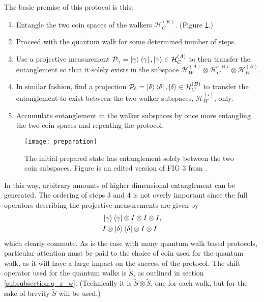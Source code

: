 The basic premise of this protocol is this:
\begin{enumerate}
    \item Entangle the two coin spaces of the walkers $\mathcal{H}^{(K)}_C$. (Figure \ref{fig:preparation}.)
    \item Proceed with the quantum walk for some determined number of steps.
    \item Use a projective measurement $\mathcal{P}_\gamma = \ket{\gamma}\bra{\gamma}, \ket{\gamma}\in\mathcal{H}^{(A)}_C$ to then transfer the entanglement so that it solely exists in the subspace $\mathcal{H}^{(A)}_W \otimes \mathcal{H}^{(B)}_C \otimes \mathcal{H}^{(B)}_W$.
    \item In similar fashion, find a projection $\mathcal{P}_\delta = \ket{\delta}\bra{\delta}, \ket{\delta}\in\mathcal{H}^{(B)}_C$ to transfer the entanglement to exist between the two walker subspaces, $\mathcal{H}^{(i)}_W$, only.
    \item Accumulate entanglement in the walker subspaces by once more entangling the two coin spaces and repeating the protocol.
\end{enumerate}

\begin{figure}
    \centering
    \texttt{[image: preparation]}
    \caption{The initial prepared state has entanglement solely between the two coin subspaces. Figure is an edited version of FIG 3 from \cite{giordani2020}.}
    \label{fig:preparation}
\end{figure}
In this way, arbitrary amounts of higher dimensional entanglement can be generated.\newline
The ordering of steps 3 and 4 is not overly important since the full operators describing the projective measurements are given by
\begin{align}
    &\ket{\gamma}\bra{\gamma} \otimes I \otimes I \otimes I,\\
    &I \otimes \ket{\delta}\bra{\delta} \otimes I \otimes I
\end{align}
which clearly commute.
As is the case with many quantum walk based protocols, particular attention must be paid to the choice of coin used for the quantum walk, as it will have a large impact on the success of the protocol.
The shift operator used for the quantum walks is $\tilde{S}$, as outlined in section \ref{subsubsection:q_r_w}.
(Technically it is $\tilde{S}\otimes\tilde{S}$, one for each walk, but for the sake of brevity $\tilde{S}$ will be used.)

